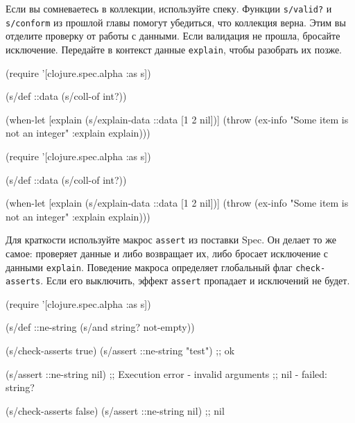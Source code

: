 
Если вы сомневаетесь в коллекции, используйте спеку. Функции \verb|s/valid?| и
\verb|s/conform| из прошлой главы  помогут убедиться, что
коллекция верна. Этим вы отделите проверку от работы с данными. Если валидация
не прошла, бросайте исключение. Передайте в контекст данные \verb|explain|,
чтобы разобрать их позже.

\ifx\DEVICETYPE\MOBILE

\begin{english}
  \begin{clojure}
(require '[clojure.spec.alpha :as s])

(s/def ::data (s/coll-of int?))

(when-let [explain (s/explain-data
                     ::data
                     [1 2 nil])]
  (throw (ex-info
           "Some item is not an integer"
           {:explain explain})))
  \end{clojure}
\end{english}

\else

\begin{english}
  \begin{clojure}
(require '[clojure.spec.alpha :as s])

(s/def ::data (s/coll-of int?))

(when-let [explain (s/explain-data ::data [1 2 nil])]
  (throw (ex-info "Some item is not an integer"
                  {:explain explain})))
  \end{clojure}
\end{english}

\fi


Для краткости используйте макрос \verb|assert| из поставки Spec. Он делает то
же самое: проверяет данные и либо возвращает их, либо бросает исключение с
данными \verb|explain|. Поведение макроса определяет глобальный флаг
\verb|check-asserts|. Если его выключить, эффект \verb|assert| пропадает и
исключений не будет.

\ifx\DEVICETYPE\MOBILE

\begin{english}
  \begin{clojure}
(require '[clojure.spec.alpha :as s])

(s/def ::ne-string
  (s/and string? not-empty))

(s/check-asserts true)
(s/assert ::ne-string "test") ;; ok

(s/assert ::ne-string nil)
;; Execution error - invalid arguments
;; nil - failed: string?

(s/check-asserts false)
(s/assert ::ne-string nil) ;; nil
  \end{clojure}
\end{english}

